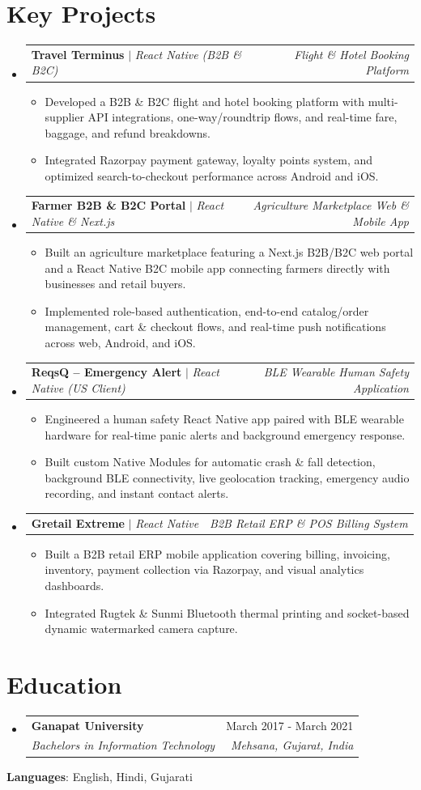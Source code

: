 \documentclass[letterpaper,10.5pt]{article}
\makeatletter
\newcommand{\resumeItem}[1]{
  \item\small{
    {#1 \vspace{-2pt}}
  }
}
\newcommand{\resumeSubheading}[4]{
  \vspace{-1pt}\item
    \begin{tabular*}{0.99\textwidth}[t]{l@{\extracolsep{\fill}}r}
      \textbf{#1} & \small #2 \\
      \textit{\small#3} & \textit{\small #4} \\
    \end{tabular*}\vspace{-6pt}
}
\newcommand{\resumeProjectHeading}[2]{
  \item
    \begin{tabular*}{0.99\textwidth}{l@{\extracolsep{\fill}}r}
      \small#1 & \textit{\small #2} \\
    \end{tabular*}\vspace{-6pt}
}
\newcommand{\resumeSubHeadingListStart}{\begin{itemize}[leftmargin=0.0in, label={}]}
\newcommand{\resumeSubHeadingListEnd}{\end{itemize}}
\newcommand{\resumeItemListStart}{\begin{itemize}[leftmargin=0.16in]}
\newcommand{\resumeItemListEnd}{\end{itemize}\vspace{-4pt}}
\makeatother
\begin{document}
\section{Key Projects}
\resumeSubHeadingListStart
\resumeProjectHeading
  {\textbf{Travel Terminus} $|$ \emph{React Native (B2B \& B2C)}}{Flight \& Hotel Booking Platform}
  \resumeItemListStart
    \resumeItem{Developed a B2B \& B2C flight and hotel booking platform with multi-supplier API integrations, one-way/roundtrip flows, and real-time fare, baggage, and refund breakdowns.}
    \resumeItem{Integrated Razorpay payment gateway, loyalty points system, and optimized search-to-checkout performance across Android and iOS.}
  \resumeItemListEnd

\resumeProjectHeading
  {\textbf{Farmer B2B \& B2C Portal} $|$ \emph{React Native \& Next.js}}{Agriculture Marketplace Web \& Mobile App}
  \resumeItemListStart
    \resumeItem{Built an agriculture marketplace featuring a Next.js B2B/B2C web portal and a React Native B2C mobile app connecting farmers directly with businesses and retail buyers.}
    \resumeItem{Implemented role-based authentication, end-to-end catalog/order management, cart \& checkout flows, and real-time push notifications across web, Android, and iOS.}
  \resumeItemListEnd

\resumeProjectHeading
  {\textbf{ReqsQ -- Emergency Alert} $|$ \emph{React Native (US Client)}}{BLE Wearable Human Safety Application}
  \resumeItemListStart
    \resumeItem{Engineered a human safety React Native app paired with BLE wearable hardware for real-time panic alerts and background emergency response.}
    \resumeItem{Built custom Native Modules for automatic crash \& fall detection, background BLE connectivity, live geolocation tracking, emergency audio recording, and instant contact alerts.}
  \resumeItemListEnd

\resumeProjectHeading
  {\textbf{Gretail Extreme} $|$ \emph{React Native}}{B2B Retail ERP \& POS Billing System}
  \resumeItemListStart
    \resumeItem{Built a B2B retail ERP mobile application covering billing, invoicing, inventory, payment collection via Razorpay, and visual analytics dashboards.}
    \resumeItem{Integrated Rugtek \& Sunmi Bluetooth thermal printing and socket-based dynamic watermarked camera capture.}
  \resumeItemListEnd
\resumeSubHeadingListEnd
\vspace{-6pt}

\section{Education}
\resumeSubHeadingListStart
\resumeSubheading
  {Ganapat University}{March 2017 - March 2021}
  {Bachelors in Information Technology}{Mehsana, Gujarat, India}
\resumeSubHeadingListEnd
\vspace{-6pt}
\small{\noindent\textbf{Languages}: English, Hindi, Gujarati}
\end{document}
